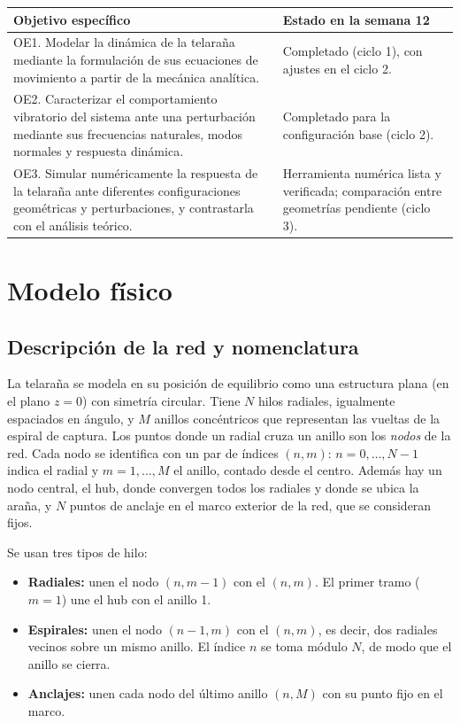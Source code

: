 \documentclass[11pt,letterpaper]{article}
\begin{document}
\begin{table}[H]
\centering\small
\begin{tabular}{@{}p{11.5cm}p{4.5cm}@{}}
\toprule
Objetivo específico & Estado en la semana 12 \\
\midrule
OE1. Modelar la dinámica de la telaraña mediante la formulación de sus
ecuaciones de movimiento a partir de la mecánica analítica. &
Completado (ciclo 1), con ajustes en el ciclo 2. \\
OE2. Caracterizar el comportamiento vibratorio del sistema ante una
perturbación mediante sus frecuencias naturales, modos normales y
respuesta dinámica. &
Completado para la configuración base (ciclo 2). \\
OE3. Simular numéricamente la respuesta de la telaraña ante diferentes
configuraciones geométricas y perturbaciones, y contrastarla con el
análisis teórico. &
Herramienta numérica lista y verificada; comparación entre geometrías
pendiente (ciclo 3). \\
\bottomrule
\end{tabular}
\end{table}

\section{Modelo físico}\label{sec:modelo}

\subsection{Descripción de la red y nomenclatura}

La telaraña se modela en su posición de equilibrio como una estructura plana
(en el plano $z=0$) con simetría circular. Tiene $N$ hilos radiales,
igualmente espaciados en ángulo, y $M$ anillos concéntricos que representan
las vueltas de la espiral de captura. Los puntos donde un radial cruza un
anillo son los \emph{nodos} de la red. Cada nodo se identifica con un par
de índices $(n,m)$: $n=0,\dots,N-1$ indica el radial y $m=1,\dots,M$ el
anillo, contado desde el centro. Además hay un nodo central, el hub, donde
convergen todos los radiales y donde se ubica la araña, y $N$ puntos de
anclaje en el marco exterior de la red, que se consideran fijos.

Se usan tres tipos de hilo:
\begin{itemize}
    \item \textbf{Radiales:} unen el nodo $(n,m-1)$ con el $(n,m)$. El primer
    tramo ($m=1$) une el hub con el anillo 1.
    \item \textbf{Espirales:} unen el nodo $(n-1,m)$ con el $(n,m)$, es decir,
    dos radiales vecinos sobre un mismo anillo. El índice $n$ se toma módulo
    $N$, de modo que el anillo se cierra.
    \item \textbf{Anclajes:} unen cada nodo del último anillo $(n,M)$ con su
    punto fijo en el marco.
\end{itemize}
\end{document}
